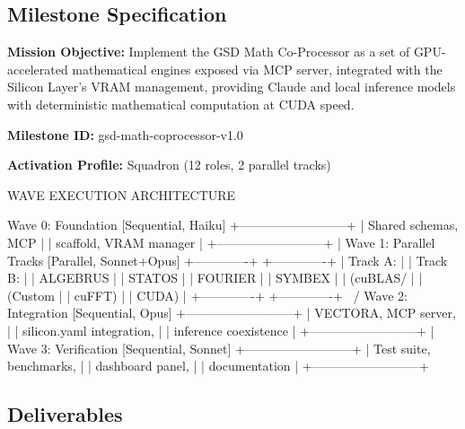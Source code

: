 \documentclass[11pt,letterpaper]{article}
\newcommand{\metafield}[2]{\textbf{\sffamily #1} #2\par}
\begin{document}
\subsection{Milestone Specification}

\metafield{Mission Objective:}{Implement the GSD Math Co-Processor as a set of GPU-accelerated mathematical engines exposed via MCP server, integrated with the Silicon Layer's VRAM management, providing Claude and local inference models with deterministic mathematical computation at CUDA speed.}

\metafield{Milestone ID:}{gsd-math-coprocessor-v1.0}
\metafield{Activation Profile:}{Squadron (12 roles, 2 parallel tracks)}

\begin{asciibox}
WAVE EXECUTION ARCHITECTURE

  Wave 0: Foundation          [Sequential, Haiku]
  +--------------------------+
  | Shared schemas, MCP      |
  | scaffold, VRAM manager   |
  +--------------------------+
            |
  Wave 1: Parallel Tracks    [Parallel, Sonnet+Opus]
  +-------------+  +-------------+
  | Track A:    |  | Track B:    |
  | ALGEBRUS    |  | STATOS      |
  | FOURIER     |  | SYMBEX      |
  | (cuBLAS/    |  | (Custom     |
  |  cuFFT)     |  |  CUDA)      |
  +-------------+  +-------------+
            \        /
  Wave 2: Integration        [Sequential, Opus]
  +--------------------------+
  | VECTORA, MCP server,     |
  | silicon.yaml integration, |
  | inference coexistence     |
  +--------------------------+
            |
  Wave 3: Verification       [Sequential, Sonnet]
  +--------------------------+
  | Test suite, benchmarks,  |
  | dashboard panel,         |
  | documentation            |
  +--------------------------+
\end{asciibox}

\subsection{Deliverables}
\end{document}
